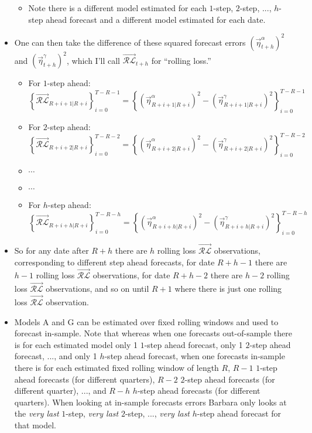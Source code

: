 \documentclass[11pt]{article}
\begin{document}
\begin{itemize}
\begin{itemize}
\item Note there is a different model estimated for each $1$-step, $2$-step, ..., $h$-step ahead forecast and a different model estimated for each date.  
\end{itemize}
\item One can then take the difference of these squared forecast errors $\left(\overrightarrow{\eta}^{\alpha}_{t+h}\right)^{2}$ and
 $\left(\overrightarrow{\eta}^{\gamma}_{t+h}\right)^{2}$, which I'll call $\overrightarrow{\mathcal{RL}}_{t+h}$ for ``rolling loss.''
\begin{itemize}
\item For $1$-step ahead: $\left\{\overrightarrow{\mathcal{RL}}_{R+i+1|R+i}\right\}_{i=0}^{T-R-1}\!\!\!\!=\left\{\left(\overrightarrow{\eta}^{\alpha}_{R+i+1|R+i}\right)^{2}\!\!-\left(\overrightarrow{\eta}^{\gamma}_{R+i+1|R+i}\right)^{2}\right\}_{i=0}^{T-R-1}$
\item For $2$-step ahead: $\left\{\overrightarrow{\mathcal{RL}}_{R+i+2|R+i}\right\}_{i=0}^{T-R-2}\!\!\!\!=\left\{\left(\overrightarrow{\eta}^{\alpha}_{R+i+2|R+i}\right)^{2}\!\!-\left(\overrightarrow{\eta}^{\gamma}_{R+i+2|R+i}\right)^{2}\right\}_{i=0}^{T-R-2}$
\item $\cdots$
\item $\cdots$
\item For $h$-step ahead: $\left\{\overrightarrow{\mathcal{RL}}_{R+i+h|R+i}\right\}_{i=0}^{T-R-h}\!\!\!\!=\left\{\left(\overrightarrow{\eta}^{\alpha}_{R+i+h|R+i}\right)^{2}\!\!-\left(\overrightarrow{\eta}^{\gamma}_{R+i+h|R+i}\right)^{2}\right\}_{i=0}^{T-R-h}$
\end{itemize}
\item So for any date after $R+h$ there are $h$ rolling loss $\overrightarrow{\mathcal{RL}}$ observations, corresponding to different step ahead forecasts, for date $R+h-1$ there are $h-1$ rolling loss $\overrightarrow{\mathcal{RL}}$ observations, for date $R+h-2$ there are $h-2$ rolling loss $\overrightarrow{\mathcal{RL}}$ observations, and so on until $R+1$ where there is just one rolling loss $\overrightarrow{\mathcal{RL}}$ observation.
\item Models A and G can be estimated over fixed rolling windows and used to forecast in-sample.  Note that whereas when one forecasts out-of-sample there is for each estimated model only 1 $1$-step ahead forecast, only 1 $2$-step ahead forecast, ..., and only 1 $h$-step ahead forecast, when one forecasts in-sample there is for each estimated fixed rolling window of length $R$, $R-1$ $1$-step ahead forecasts (for different quarters), $R-2$ $2$-step ahead forecasts (for different quarter), ..., and $R-h$ $h$-step ahead forecasts (for different quarters).  When looking at in-sample forecasts errors Barbara only looks at the \emph{very last} $1$-step, \emph{very last} $2$-step, ..., \emph{very last} $h$-step ahead forecast for that model.  

\end{itemize}
\end{document}
